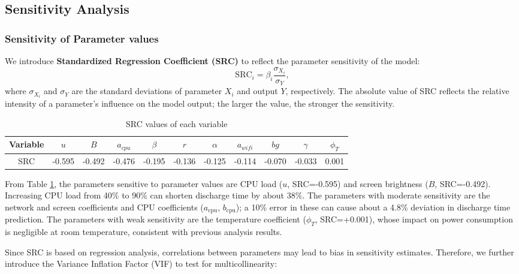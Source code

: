 \documentclass{mcmthesis}  %
\begin{document}
	\subsection{Sensitivity Analysis}
	\subsubsection{Sensitivity of Parameter values}
	We introduce \textbf{Standardized Regression Coefficient (SRC)} to reflect the parameter sensitivity of the model:
	\begin{equation}
		\mathrm{SRC}_i = \beta_i \frac{\sigma_{X_i}}{\sigma_Y},
	\end{equation}
	where $\sigma_{X_i}$ and $\sigma_Y$ are the standard deviations of parameter $X_i$ and output $Y$, respectively.
	The absolute value of SRC reflects the relative intensity of a parameter's influence on the model output; the larger the value, the stronger the sensitivity.
	
	\begin{table}[htbp]
		\centering
		\caption{SRC values of each variable}
		\renewcommand{\arraystretch}{0.8}
		\begin{tabular}{@{}ccccccccccc@{}}
			\toprule
			Variable & $u$ & $B$ & $a_{cpu}$  & $\beta$ & $r$ & $\alpha$  & $a_{wifi}$ & $bg$ & $\gamma$ & $\phi_T$ \\
			\midrule
			\rowcolor{LightBlue}
			SRC & -0.595 & -0.492 & -0.476  & -0.195 & -0.136 & -0.125 & -0.114 & -0.070 & -0.033 & 0.001 \\
			\bottomrule
		\end{tabular}
		\label{tab:src}
	\end{table}
	
	From Table \ref{tab:src}, the parameters sensitive to parameter values are CPU load ($u$, SRC=-0.595) and screen brightness ($B$, SRC=-0.492). Increasing CPU load from 40\% to 90\% can shorten discharge time by about 38\%. The parameters with moderate sensitivity are the network and screen coefficients and CPU coefficients ($a_{\text{cpu}}$, $b_{\text{cpu}}$); a 10\% error in these can cause about a 4.8\% deviation in discharge time prediction. The parameters with weak sensitivity are the temperature coefficient ($\phi_T$, SRC=+0.001), whose impact on power consumption is negligible at room temperature, consistent with previous analysis results.
	
	Since SRC is based on regression analysis, correlations between parameters may lead to bias in sensitivity estimates. Therefore, we further introduce the Variance Inflation Factor (VIF) to test for multicollinearity:
	
\end{document}
